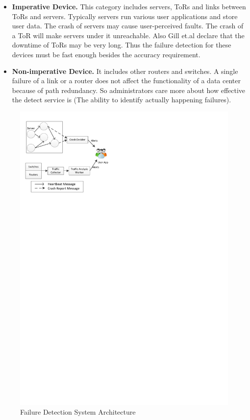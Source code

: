 \documentclass{sig-alternate-05-2015}
\begin{document}
\begin{itemize}
\item \textbf{Imperative Device.} This category includes servers, ToRs and links between ToRs and servers. Typically servers run various user applications and store user data. The crash of servers may cause user-perceived faults. The crash of a ToR will make servers under it unreachable. Also Gill et.al declare that the downtime of ToRs may be very long. Thus the failure detection for these devices must be fast enough besides the accuracy requirement.

\item \textbf{Non-imperative Device.} It includes other routers and switches. A single failure of a link or a router does not affect the functionality of a data center because of path redundancy. So administrators care more about how effective the detect service is (The ability to identify actually happening failures).

\end{itemize}

\begin{figure}
\centering
\includegraphics{system}
\caption{Failure Detection System Architecture}
\end{figure}
\end{document}
